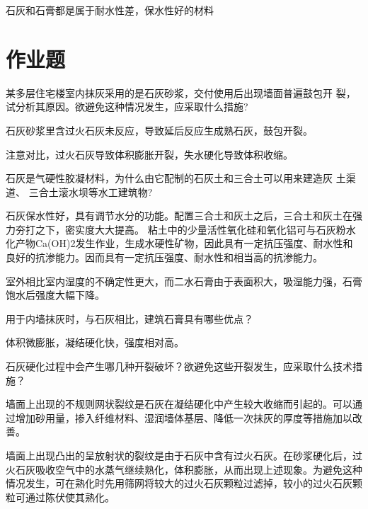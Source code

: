 \documentclass[12pt, a4paper, oneside, UTF8]{ctexbook}
\begin{document}
\begin{remark}
    石灰和石膏都是属于耐水性差，保水性好的材料
\end{remark}

\section{作业题}

\begin{example}
    某多层住宅楼室内抹灰采用的是石灰砂浆，交付使用后出现墙面普遍鼓包开
裂，试分析其原因。欲避免这种情况发生，应采取什么措施? 

    石灰砂浆里含过火石灰未反应，导致延后反应生成熟石灰，鼓包开裂。
\end{example}

\begin{remark}
    注意对比，过火石灰导致体积膨胀开裂，失水硬化导致体积收缩。
\end{remark}

\begin{example}
    石灰是气硬性胶凝材料，为什么由它配制的石灰土和三合土可以用来建造灰
土渠道、 三合土滚水坝等水工建筑物?

    石灰保水性好，具有调节水分的功能。配置三合土和灰土之后，三合土和灰土在强力夯打之下，密实度大大提高。
粘土中的少量活性氧化硅和氧化铝可与石灰粉水化产物Ca(OH)2发生作业，生成水硬性矿物，因此具有一定抗压强度、耐水性和良好的抗渗能力。因而具有一定抗压强度、耐水性和相当高的抗渗能力。
\end{example}

\begin{example}
    室外相比室内湿度的不确定性更大，而二水石膏由于表面积大，吸湿能力强，石膏饱水后强度大幅下降。
\end{example}

\begin{example}
    用于内墙抹灰时，与石灰相比，建筑石膏具有哪些优点？

    体积微膨胀，凝结硬化快，强度相对高。
\end{example}

\begin{example}
石灰硬化过程中会产生哪几种开裂破坏？欲避免这些开裂发生，应采取什么技术措施？

墙面上出现的不规则网状裂纹是石灰在凝结硬化中产生较大收缩而引起的。可以通过增加砂用量，掺入纤维材料、湿润墙体基层、降低一次抹灰的厚度等措施加以改善。

墙面上出现凸出的呈放射状的裂纹是由于石灰中含有过火石灰。在砂浆硬化后，过火石灰吸收空气中的水蒸气继续熟化，体积膨胀，从而出现上述现象。为避免这种情况发生，可在熟化时先用筛网将较大的过火石灰颗粒过滤掉，较小的过火石灰颗粒可通过陈伏使其熟化。
\end{example}
\end{document}
